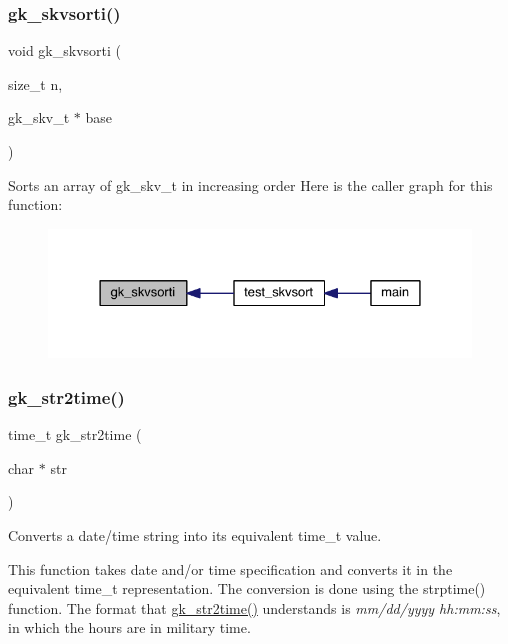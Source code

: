 \subsubsection{\texorpdfstring{gk\+\_\+skvsorti()}{gk\_skvsorti()}}
{\footnotesize\ttfamily void gk\+\_\+skvsorti (\begin{DoxyParamCaption}\item[{size\+\_\+t}]{n,  }\item[{gk\+\_\+skv\+\_\+t $\ast$}]{base }\end{DoxyParamCaption})}

Sorts an array of gk\+\_\+skv\+\_\+t in increasing order Here is the caller graph for this function\+:\nopagebreak
\begin{figure}[H]
\begin{center}
\leavevmode
\includegraphics[width=328pt]{a00077_ad540fc9b43ce41269f7f33712f5f71c2_icgraph}
\end{center}
\end{figure}
\mbox{\label{a00077_a5973a9945423f69a60d3b209082fd718}} 
\subsubsection{\texorpdfstring{gk\+\_\+str2time()}{gk\_str2time()}}
{\footnotesize\ttfamily time\+\_\+t gk\+\_\+str2time (\begin{DoxyParamCaption}\item[{char $\ast$}]{str }\end{DoxyParamCaption})}



Converts a date/time string into its equivalent time\+\_\+t value. 

This function takes date and/or time specification and converts it in the equivalent time\+\_\+t representation. The conversion is done using the strptime() function. The format that \hyperlink{a00143_a5973a9945423f69a60d3b209082fd718}{gk\+\_\+str2time()} understands is {\itshape mm/dd/yyyy hh\+:mm\+:ss}, in which the hours are in military time.


